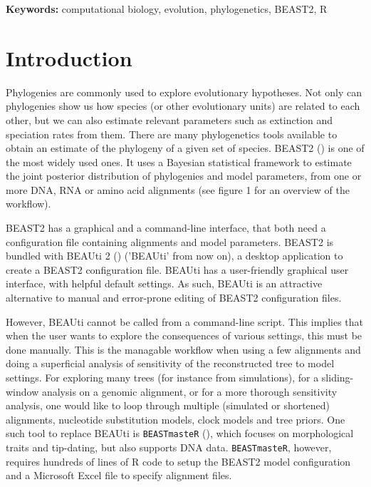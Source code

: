 \documentclass{article}
\begin{document}
{\bf Keywords:} computational biology, evolution, phylogenetics, BEAST2, R

\section{Introduction}

Phylogenies are commonly used to explore evolutionary hypotheses.
Not only can phylogenies show us how species (or other
evolutionary units) are related to each other, 
but we can also estimate relevant parameters such as extinction and 
speciation rates from them.
There are many phylogenetics tools available to obtain an estimate 
of the phylogeny of a given set of species. 
BEAST2 (\cite{bouckaert2014beast}) is one of the most widely used ones.
It uses a Bayesian statistical framework to estimate 
the joint posterior distribution of phylogenies and model parameters, 
from one or more DNA, RNA or amino acid alignments (see figure 1 
for an overview of the workflow). 

BEAST2 has a graphical and a command-line interface, 
that both need a configuration file containing 
alignments and model parameters.
BEAST2 is bundled with BEAUti 2 (\cite{drummond2012bayesian}) ('BEAUti' from now on), 
a desktop application to create a BEAST2 configuration file.
BEAUti has a user-friendly graphical user interface, with helpful
default settings.
As such, BEAUti is an attractive alternative 
to manual and error-prone editing of BEAST2 configuration files. 

However, BEAUti cannot be called from a command-line script.
This implies that when the user 
wants to explore the consequences of various settings, this must be done manually.
This is the managable workflow when using a few alignments and doing a superficial 
analysis of sensitivity of the reconstructed tree to model settings. 
For exploring many trees (for instance from simulations), 
for a sliding-window analysis on a genomic alignment, 
or for a more thorough sensitivity analysis, one would like to loop through 
multiple (simulated or shortened) alignments, nucleotide substitution models, 
clock models and tree priors. 
One such tool to replace BEAUti is \verb;BEASTmasteR; (\cite{beastmaster}),
which focuses on morphological traits and tip-dating, but also 
supports DNA data. \verb;BEASTmasteR;, however, requires hundreds of
lines of R code to setup the BEAST2 model configuration 
and a Microsoft Excel file to specify alignment files.
\end{document}
